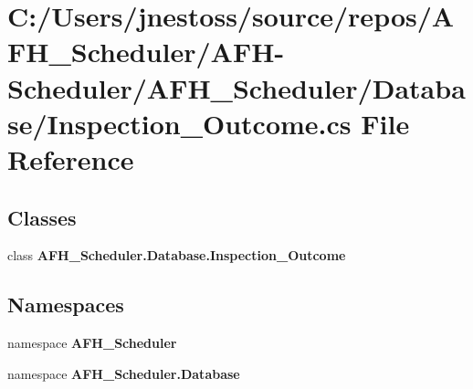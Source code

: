 \section{C\+:/\+Users/jnestoss/source/repos/\+A\+F\+H\+\_\+\+Scheduler/\+A\+F\+H-\/\+Scheduler/\+A\+F\+H\+\_\+\+Scheduler/\+Database/\+Inspection\+\_\+\+Outcome.cs File Reference}
\label{_inspection___outcome_8cs}
\subsection*{Classes}
\begin{DoxyCompactItemize}
\item 
class \textbf{ A\+F\+H\+\_\+\+Scheduler.\+Database.\+Inspection\+\_\+\+Outcome}
\end{DoxyCompactItemize}
\subsection*{Namespaces}
\begin{DoxyCompactItemize}
\item 
namespace \textbf{ A\+F\+H\+\_\+\+Scheduler}
\item 
namespace \textbf{ A\+F\+H\+\_\+\+Scheduler.\+Database}
\end{DoxyCompactItemize}
